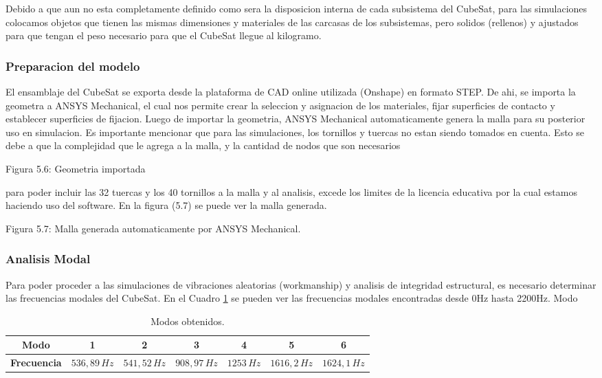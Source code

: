     Debido a que aun no esta completamente definido como sera la disposicion interna de
    cada subsistema del CubeSat, para las simulaciones colocamos objetos que tienen las mismas
    dimensiones y materiales de las carcasas de los subsistemas, pero solidos (rellenos) y ajustados
    para que tengan el peso necesario para que el CubeSat llegue al kilogramo.

    \subsubsection{Preparacion del modelo}

       El ensamblaje del CubeSat se exporta desde la plataforma de CAD online utilizada (Onshape) en formato
       STEP. De ahi, se importa la geometra a ANSYS Mechanical, el cual nos permite crear la seleccion
       y asignacion de los materiales, fijar superficies de contacto y
       establecer superficies de fijacion. Luego de importar la geometria, ANSYS Mechanical
       automaticamente genera la malla para su posterior uso en simulacion.
       Es importante mencionar que para las simulaciones, los
       tornillos y tuercas no estan siendo tomados en cuenta. Esto se debe a que la complejidad que le agrega
       a la malla, y la cantidad de nodos que son necesarios

       Figura 5.6: Geometria importada

       para poder incluir las 32 tuercas y los 40 tornillos a
       la malla y al analisis, excede los limites de la licencia
       educativa por la cual estamos haciendo uso del software. En la figura (5.7) se puede ver la
       malla generada.

       Figura 5.7: Malla generada automaticamente por ANSYS Mechanical.

    \subsubsection{Analisis Modal}

      Para poder proceder a las simulaciones de vibraciones aleatorias (workmanship) y analisis
      de integridad estructural, es necesario determinar las frecuencias modales del CubeSat. En
      el Cuadro \ref{tab:modos_obtenidos} se pueden ver las frecuencias modales encontradas desde 0Hz hasta 2200Hz.
      Modo

      \begin{table}[H]
      \centering
      \begin{tabular}{|c|c|c|c|c|c|c|}
      \hline
      \textbf{Modo}       & 1           & 2           & 3           & 4         & 5           & 6          \\
      \hline
      \textbf{Frecuencia} & $536{,}89\,Hz$ & $541{,}52\,Hz$ & $908{,}97\,Hz$ & $1253\,Hz$ & $1616{,}2\,Hz$ & $1624{,}1\,Hz$ \\
      \hline
      \end{tabular}
      \caption{Modos obtenidos.}
      \label{tab:modos_obtenidos}
      \end{table}

